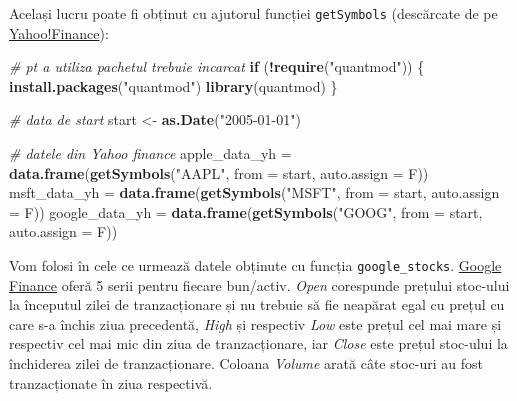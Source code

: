 \documentclass[]{article}
\newenvironment{Shaded}{\begin{snugshade}}{\end{snugshade}}
\newcommand{\KeywordTok}[1]{\textcolor[rgb]{0.13,0.29,0.53}{\textbf{#1}}}
\newcommand{\DataTypeTok}[1]{\textcolor[rgb]{0.13,0.29,0.53}{#1}}
\newcommand{\StringTok}[1]{\textcolor[rgb]{0.31,0.60,0.02}{#1}}
\newcommand{\CommentTok}[1]{\textcolor[rgb]{0.56,0.35,0.01}{\textit{#1}}}
\newcommand{\ControlFlowTok}[1]{\textcolor[rgb]{0.13,0.29,0.53}{\textbf{#1}}}
\newcommand{\OperatorTok}[1]{\textcolor[rgb]{0.81,0.36,0.00}{\textbf{#1}}}
\newcommand{\NormalTok}[1]{#1}
\begin{document}
\begin{Shaded}
\begin{Highlighting}[]
{{\NormalTok{msft_data}\OperatorTok{$}\NormalTok{Date =}\StringTok{ }\KeywordTok{as.Date}\NormalTok{(}\KeywordTok{strptime}\NormalTok{(}\KeywordTok{as.character}\NormalTok{(msft_data}\OperatorTok{$}\NormalTok{Date), }\StringTok{"%
                            \DataTypeTok{origin =} \StringTok{"1970-01-01"}\NormalTok{)}
  
\NormalTok{msft_data =}\StringTok{ }\NormalTok{msft_data[}\KeywordTok{order}\NormalTok{(msft_data}\OperatorTok{$}\NormalTok{Date), ]}
\end{Highlighting}
\end{Shaded}

Același lucru poate fi obținut cu ajutorul funcției \texttt{getSymbols}
(descărcate de pe \href{https://finance.yahoo.com/}{Yahoo!Finance}):

\begin{Shaded}
\begin{Highlighting}[]
\CommentTok{# pt a utiliza pachetul trebuie incarcat}
\ControlFlowTok{if}\NormalTok{ (}\OperatorTok{!}\KeywordTok{require}\NormalTok{(}\StringTok{"quantmod"}\NormalTok{)) \{}
    \KeywordTok{install.packages}\NormalTok{(}\StringTok{"quantmod"}\NormalTok{)}
    \KeywordTok{library}\NormalTok{(quantmod)}
\NormalTok{\}}

\CommentTok{# data de start}
\NormalTok{start <-}\StringTok{ }\KeywordTok{as.Date}\NormalTok{(}\StringTok{"2005-01-01"}\NormalTok{)}

\CommentTok{# datele din Yahoo finance}
\NormalTok{apple_data_yh =}\StringTok{ }\KeywordTok{data.frame}\NormalTok{(}\KeywordTok{getSymbols}\NormalTok{(}\StringTok{"AAPL"}\NormalTok{, }\DataTypeTok{from =}\NormalTok{ start, }\DataTypeTok{auto.assign =}\NormalTok{ F))}
\NormalTok{msft_data_yh =}\StringTok{ }\KeywordTok{data.frame}\NormalTok{(}\KeywordTok{getSymbols}\NormalTok{(}\StringTok{"MSFT"}\NormalTok{, }\DataTypeTok{from =}\NormalTok{ start, }\DataTypeTok{auto.assign =}\NormalTok{ F))}
\NormalTok{google_data_yh =}\StringTok{ }\KeywordTok{data.frame}\NormalTok{(}\KeywordTok{getSymbols}\NormalTok{(}\StringTok{"GOOG"}\NormalTok{, }\DataTypeTok{from =}\NormalTok{ start, }\DataTypeTok{auto.assign =}\NormalTok{ F))}
\end{Highlighting}
\end{Shaded}

Vom folosi în cele ce urmează datele obținute cu funcția
\texttt{google\_stocks}.
\href{https://finance.google.com/finance}{Google Finance} oferă 5 serii
pentru fiecare bun/activ. \emph{Open} corespunde prețului stoc-ului la
începutul zilei de tranzacționare și nu trebuie să fie neapărat egal cu
prețul cu care s-a închis ziua precedentă, \emph{High} și respectiv
\emph{Low} este prețul cel mai mare și respectiv cel mai mic din ziua de
tranzacționare, iar \emph{Close} este prețul stoc-ului la închiderea
zilei de tranzacționare. Coloana \emph{Volume} arată câte stoc-uri au
fost tranzacționate în ziua respectivă.
\end{document}
